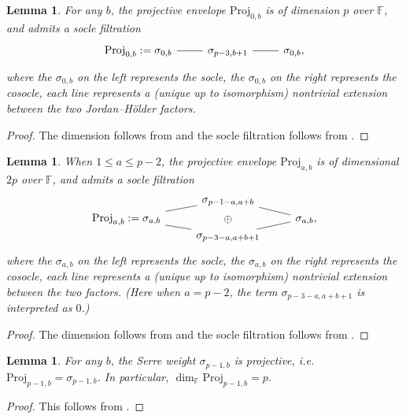\documentclass[12pt]{amsart}
\newtheorem{lemma}[subsection]{Lemma}
\theoremstyle{definition}
\numberwithin{equation}{subsection}
\def\FF{\mathbb{F}}
\newcommand{\Proj}{\mathrm{Proj}}
\begin{document}
\begin{lemma}
\label{L:projective envelope_part1}
For any $b$, the projective envelope $\Proj_{0,b}$ is of dimension $p$ over $\FF$, and admits a socle filtration
\[
\begin{tikzcd}
\Proj_{0,b}: = \sigma_{0,b} \ar[r, -]& \sigma_{p-3, b+1} \ar[r, -] &\sigma_{0,b},
\end{tikzcd}
\]
where the $\sigma_{0,b}$ on the left represents the socle, the $\sigma_{0,b}$ on the right represents the cosocle, each line represents a (unique up to isomorphism) nontrivial extension between the two Jordan--H\"older factors.
\end{lemma}
\begin{proof}
The dimension follows from \cite[Lemma~4.1.7]{paskunas} and the socle filtration follows from \cite[Lemma~3.4]{breuil-paskunas}.
\end{proof}

\begin{lemma}
\label{L:projective envelope_part2}
When $1 \leq a \leq p-2$, the projective envelope $\Proj_{a,b}$ is of dimensional $2p$ over $\FF$, and admits a socle filtration 
\[
\begin{tikzcd}[row sep = 0pt]
& \sigma_{p-1-a,a+b} \ar[rd,-] \ar[dd, phantom, "\oplus" description]
\\
\Proj_{a,b}: = \sigma_{a,b} \ar[ru,-] \ar[rd,-] && \sigma_{a,b}, \\
& \sigma_{p-3-a,a+b+1} \ar[ru,-]
\end{tikzcd}
\]
where the $\sigma_{a,b}$ on the left represents the socle, the $\sigma_{a,b}$ on the right represents the cosocle, each line represents a (unique up to isomorphism) nontrivial extension between the two factors. (Here when $a=p-2$, the term $\sigma_{p-3-a, a+b+1}$ is interpreted as $0$.)
\end{lemma}
\begin{proof}
The dimension follows from \cite[Lemma~4.1.7]{paskunas} and the socle filtration follows from \cite[Lemma~3.5]{breuil-paskunas}.
\end{proof}

\begin{lemma}
\label{L:projective envelope_part3}
For any $b$, the Serre weight $\sigma_{p-1,b}$ is projective, i.e.\ $\Proj_{p-1,b} = \sigma_{p-1,b}$. In particular, $\dim_\FF\Proj_{p-1,b} = p$.
\end{lemma}
\begin{proof}
This follows from \cite[Corollary~4.2.22]{paskunas}.
\end{proof}
\end{document}
